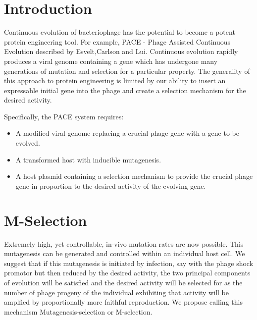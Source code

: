 \documentclass[10pt,letterpaper]{article}
\begin{document}

\linenumbers

\section*{Introduction}
Continuous evolution of bacteriophage has the potential to become a potent protein engineering tool\cite{pace}\cite{monsanto}.
For example, PACE - Phage Assisted Continuous Evolution described by Esvelt,Carlson and Lui. 
Continuous evolution rapidly produces a viral genome containing a gene
which has undergone many generations of mutation and selection for
a particular property.  The generality of this approach to protein engineering
is limited by our ability to insert an expressable initial gene into the phage and create a selection mechanism for the desired activity.

Specifically, the PACE system requires:
\begin{itemize}

\item{}
A modified viral genome replacing a crucial phage gene with a gene to be evolved.

\item{}
A transformed host with inducible mutagenesis.

\item{}
A host plasmid containing a selection mechanism to provide the crucial phage gene in proportion to the desired activity of the evolving gene.
\end{itemize}

\section{M-Selection}
Extremely high, yet controllable, in-vivo mutation rates are now possible\cite{mutation}.  This mutagenesis can be generated and controlled within an individual host cell.  We suggest that if this mutagenesis is initiated  by infection, say with the phage shock promotor but then reduced by the desired activity, the two principal components of evolution will be satisfied and the desired activity will be selected for as the number of phage progeny of the individual exhibiting that activity will be amplfied by proportionally more faithful reproduction.  We propose calling this mechanism Mutagenesis-selection or M-selection.
\end{document}
